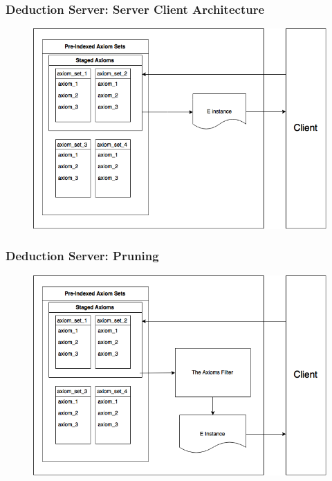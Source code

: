 \documentclass[10pt]{beamer}
\begin{document}
\begin{frame}[fragile]
  \frametitle{Deduction Server: Server Client Architecture }
  \begin{figure} \includegraphics[width=\linewidth,height=\textheight,keepaspectratio]{imgs/TheDeductionServerWithoutPrune.png} \end{figure}
\end{frame}

\begin{frame}[fragile]
  \frametitle{Deduction Server: Pruning}
    \begin{figure} \includegraphics[width=\linewidth,height=\textheight,keepaspectratio]{imgs/TheDeductionServerSingleInstance.png} \end{figure}
\end{frame}
\end{document}
